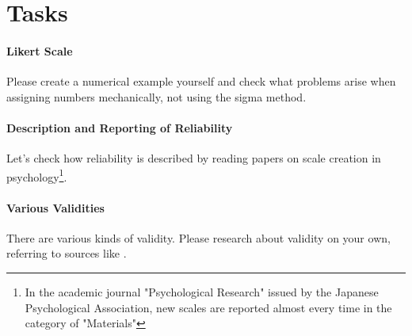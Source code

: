 \documentclass{ltjsbook}
\begin{document}
\section{Tasks}
\paragraph{Likert Scale} Please create a numerical example yourself and check what problems arise when assigning numbers mechanically, not using the sigma method.
\paragraph{Description and Reporting of Reliability} Let's check how reliability is described by reading papers on scale creation in psychology\footnote{In the academic journal "Psychological Research" issued by the Japanese Psychological Association, new scales are reported almost every time in the category of "Materials"}.
\paragraph{Various Validities} There are various kinds of validity. Please research about validity on your own, referring to sources like \textcite{kosugi2016b}.
\end{document}
